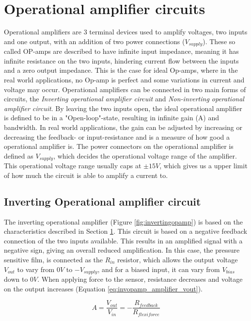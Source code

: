 \section{Operational amplifier circuits}
\label{sec:opamps}
Operational amplifiers are 3 terminal devices used to amplify voltages, two inputs and one output, with an addition of two power connections ($V_{supply}$). These so called OP-amps are described to have infinite input impedance, meaning it has infinite resistance on the two inputs, hindering current flow between the inputs and a zero output impedance. This is the case for ideal Op-amps, where in the real world applications, no Op-amp is perfect and some variations in current and voltage may occur. Operational amplifiers can be connected in two main forms of circuits, the \textit{Inverting operational amplifier circuit} and \textit{Non-inverting operational amplifier circuit}. By leaving the two inputs open, the ideal operational amplifier is defined to be in a "Open-loop"-state, resulting in infinite gain (A) and bandwidth. In real world applications, the gain can be adjusted by increasing or decreasing the feedback- or input-resistance and is a measure of how good a operational amplifier is. The power connectors on the operational amplifier is defined as $V_{supply}$, which decides the operational voltage range of the amplifier. This operational voltage range usually caps at $\pm 15V$, which gives us a upper limit of how much the circuit is able to amplify a current to.

\subsection{Inverting Operational amplifier circuit}
\label{subsec:invopamp}
The inverting operational amplifier (Figure \ref{fig:invertingopamp}) is based on the characteristics described in Section \ref{sec:opamps}. This circuit is based on a negative feedback connection of the two inputs available. This results in an amplified signal with a negative sign, giving an overall reduced amplification. In this case, the pressure sensitive film, is connected as the $R_{in}$ resistor, which allows the output voltage $V_{out}$ to vary from $0V$ to $-V_{supply}$, and for a biased input, it can vary from $V_{bias}$ down to $0V$. When applying force to the sensor, resistance decreases and voltage on the output increases (Equation \ref{eq:invopamp_amplifier_vout}).

\begin{equation}
\label{eq:invopamp_amplifier}
    A = \frac{V_{out}}{V_{in}} = - \frac{R_{feedback}}{R_{flexiforce}}
\end{equation}

